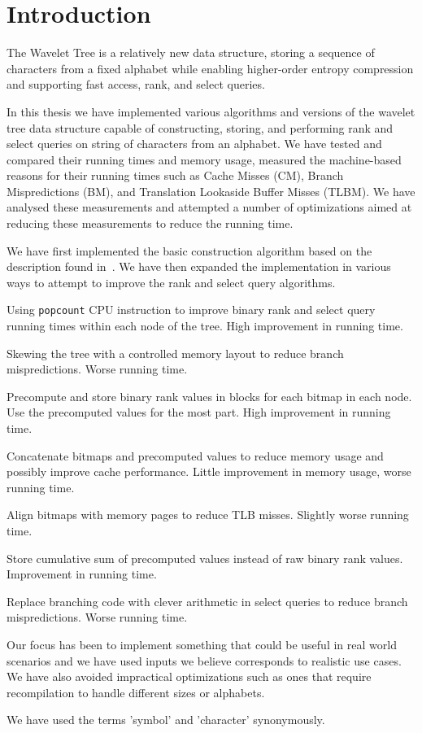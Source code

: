 \section{Introduction}
The Wavelet Tree is a relatively new data structure, storing a sequence of characters from a fixed alphabet while enabling higher-order entropy compression and supporting fast access, rank, and select queries.

In this thesis we have implemented various algorithms and versions of the wavelet tree data structure capable of constructing, storing, and performing rank and select queries on string of characters from an alphabet. We have tested and compared their running times and memory usage, measured the machine-based reasons for their running times such as Cache Misses (CM), Branch Mispredictions (BM), and Translation Lookaside Buffer Misses (TLBM). We have analysed these measurements and attempted a number of optimizations aimed at reducing these measurements to reduce the running time.

We have first implemented the basic construction algorithm based on the description found in~\citep[Section 2]{Navjda13}.
We have then expanded the implementation in various ways to attempt to improve the rank and select query algorithms.
\begin{description*}
\item[Using \texttt{popcount} CPU instruction] to improve binary rank and select query running times within each node of the tree. High improvement in running time.
\item[Skewing the tree] with a controlled memory layout to reduce branch mispredictions. Worse running time.
\item[Precompute and store binary rank values] in blocks for each bitmap in each node. Use the precomputed values for the most part. High improvement in running time.
\item[Concatenate bitmaps and precomputed values] to reduce memory usage and possibly improve cache performance. Little improvement in memory usage, worse running time.
\item[Align bitmaps with memory pages] to reduce TLB misses. Slightly worse running time.
\item[Store cumulative sum of precomputed values] instead of raw binary rank values. Improvement in running time.
\item[Replace branching code with clever arithmetic] in select queries to reduce branch mispredictions. Worse running time.
\end{description*}

Our focus has been to implement something that could be useful in real world scenarios and we have used inputs we believe corresponds to realistic use cases.
We have also avoided impractical optimizations such as ones that require recompilation to handle different sizes or alphabets.

We have used the terms 'symbol' and 'character' synonymously.